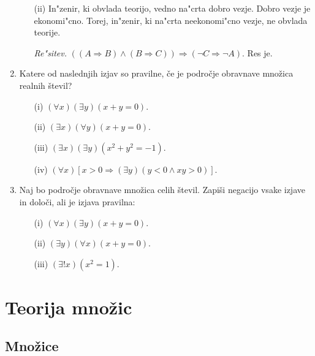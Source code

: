 \documentclass[11pt,paper=b5,DIV=13,headinclude,footinclude]{scrbook}
\begin{document}
\begin{enumerate}
\begin{enumerate}
\item[(ii)] In"zenir, ki obvlada teorijo, vedno na"crta dobro vezje. Dobro vezje je ekonomi"cno. Torej, in"zenir, ki na"crta neekonomi"cno vezje, ne obvlada teorije. 

\emph{ Re"sitev.} $((A\Rightarrow B) \wedge (B\Rightarrow C)) \Rightarrow (\neg C \Rightarrow \neg A)$. Res je.
\end{enumerate}





\item {\color{blue}Katere od naslednjih izjav so pravilne, če je področje
obravnave množica realnih števil?}
\begin{enumerate}
\item[(i)] $(\forall x)(\exists y)(x+y=0)$.
\item[(ii)] $(\exists x)(\forall y)(x+y=0)$.
\item[(iii)] $(\exists x)(\exists y)(x^2+y^2 =-1)$.
\item[(iv)] $(\forall x)[x>0 \Rightarrow (\exists y)(y<0 \wedge xy>0)]$.
\end{enumerate} 

\item {\color{red}Naj bo področje obravnave množica celih števil. Zapiši
negacijo vsake izjave in določi, ali je izjava pravilna:
\begin{enumerate}
\item[(i)] $(\forall x)(\exists y)(x+y=0)$.
\item[(ii)] $(\exists y)(\forall x)(x+y=0)$.
\item[(iii)] $(\exists!x)(x^2=1)$.
\end{enumerate}}
\end{enumerate}

\chapter{Teorija množic}

\section{Množice}
\end{document}
